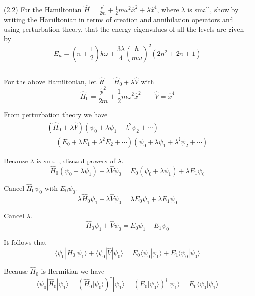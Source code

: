 \documentclass[12pt]{article}
\begin{document}
(2.2)
For the Hamiltonian
$\hat H=\frac{\hat p^2}{2m}+\frac{1}{2}m\omega^2\hat x^2+\lambda\hat x^4$,
where $\lambda$ is small, show by writing the Hamiltonian
in terms of creation and annihilation operators and
using perturbation theory, that the energy eigenvalues
of all the levels are given by
\begin{equation*}
E_n=\left(n+\frac{1}{2}\right)\hbar\omega
+\frac{3\lambda}{4}\left(\frac{\hbar}{m\omega}\right)^2
\left(2n^2+2n+1\right)
\tag{2.67}
\end{equation*}

\bigskip
\hrule

\bigskip
For the above Hamiltonian, let $\hat H=\hat H_0+\lambda\hat V$ with
\begin{equation*}
\hat H_0=\frac{\hat p^2}{2m}+\frac{1}{2}m\omega^2\hat x^2
\qquad
\hat V=\hat x^4
\end{equation*}

From perturbation theory we have
\begin{multline*}
\left(\hat H_0+\lambda\hat V\right)\left(\psi_0+\lambda\psi_1+\lambda^2\psi_2+\cdots\right)
\\
=\left(E_0+\lambda E_1+\lambda^2 E_2+\cdots\right)\left(\psi_0+\lambda\psi_1+\lambda^2\psi_2+\cdots\right)
\end{multline*}

Because $\lambda$ is small, discard powers of $\lambda$.
\begin{equation*}
\hat H_0(\psi_0+\lambda\psi_1)+\lambda \hat V\psi_0=E_0(\psi_0+\lambda\psi_1)+\lambda E_1\psi_0
\end{equation*}

Cancel $\hat H_0\psi_0$ with $E_0\psi_0$.
\begin{equation*}
\lambda\hat H_0\psi_1+\lambda \hat V\psi_0=\lambda E_0\psi_1+\lambda E_1\psi_0
\end{equation*}

Cancel $\lambda$.
\begin{equation*}
\hat H_0\psi_1+\hat V\psi_0=E_0\psi_1+E_1\psi_0
\end{equation*}

It follows that
\begin{equation*}
\langle\psi_0|\hat H_0|\psi_1\rangle
+\langle\psi_0|\hat V|\psi_0\rangle
=E_0\langle\psi_0|\psi_1\rangle
+E_1\langle\psi_0|\psi_0\rangle
\tag{1}
\end{equation*}

Because $\hat H_0$ is Hermitian we have
\begin{equation*}
\langle\psi_0|\hat H_0|\psi_1\rangle
=\left(\hat H_0|\psi_0\rangle\right)^\dag|\psi_1\rangle
=\left(E_0|\psi_0\rangle\right)^\dag|\psi_1\rangle
=E_0\langle\psi_0|\psi_1\rangle
\end{equation*}
\end{document}
